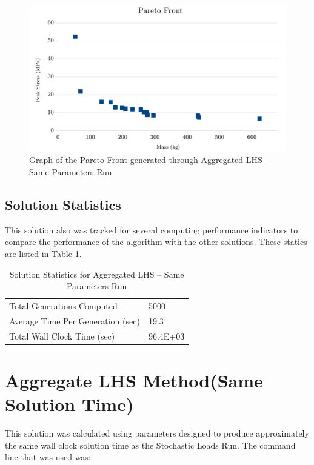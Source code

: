 \begin{figure}
\includegraphics[width=\textwidth]{img/s2i80g200_front.png}
\caption{Graph of the Pareto Front generated through Aggregated LHS -- Same Parameters Run}
\label{fig:pfront_agg_sameparam}
\end{figure}

\subsection{Solution Statistics}
This solution also was tracked for several computing performance indicators to compare the performance of the algorithm with the other solutions. These statics are listed in Table \ref{tab:stat_agg_sameparam}. 

\begin{table}[!htbp]
  \centering
  \begin{tabular}{|l|l|}
    \hline
	  Total Generations Computed & 5000\\
    Average Time Per Generation (sec) & 19.3\\
    Total Wall Clock Time (sec)	 & 96.4E+03\\
    \hline
  \end{tabular}
  \caption{Solution Statistics for Aggregated LHS -- Same Parameters Run}
  \label{tab:stat_agg_sameparam}
\end{table}

\section{Aggregate LHS Method(Same Solution Time)}
This solution was calculated using parameters designed to produce approximately the same wall clock solution time as the Stochastic Loads Run. The command line that was used was:

